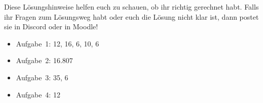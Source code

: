 \documentclass{cssheet}
\begin{document}
Diese Lösungshinweise helfen euch zu schauen, ob ihr richtig gerechnet habt. Falls ihr Fragen zum Lösungsweg habt oder euch die Lösung nicht klar ist, dann postet sie in Discord oder in Moodle!

\begin{itemize}
\item Aufgabe~1: 12, 16, 6, 10, 6
\item Aufgabe~2: 16.807
\item Aufgabe~3: 35, 6
\item Aufgabe~4: 12
\end{itemize}

\newpage
\printlicense

\printsocials
\end{document}
